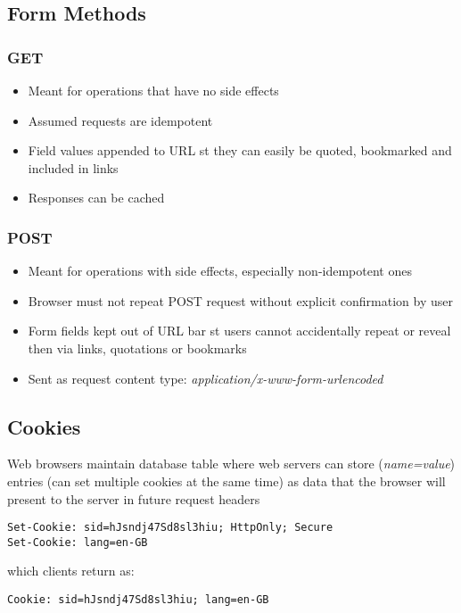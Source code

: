 \documentclass{article}
\begin{document}
\subsection{Form Methods}
\subsubsection{GET}
\begin{itemize}
	\item Meant for operations that have no side effects
	\item Assumed requests are idempotent
	\item Field values appended to URL st they can easily be quoted, bookmarked and included in links
	\item Responses can be cached
\end{itemize}

\subsubsection{POST}
\begin{itemize}
	\item Meant for operations with side effects, especially non-idempotent ones
	\item Browser must not repeat POST request without explicit confirmation by user
	\item Form fields kept out of URL bar st users cannot accidentally repeat or reveal then via links, quotations or bookmarks
	\item Sent as request content type: \textit{application/x-www-form-urlencoded}
\end{itemize}

\subsection{Cookies}
Web browsers maintain database table where web servers can store (\textit{name=value}) entries (can set multiple cookies at the same time) as data that the browser will present to the server in future request headers

\begin{lstlisting}
Set-Cookie: sid=hJsndj47Sd8sl3hiu; HttpOnly; Secure
Set-Cookie: lang=en-GB
\end{lstlisting} 
which clients return as:
\begin{lstlisting}
Cookie: sid=hJsndj47Sd8sl3hiu; lang=en-GB
\end{lstlisting}
\end{document}
